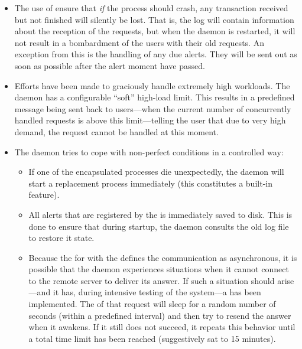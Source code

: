 \documentclass[a4paper,english,11pt,twoside,openright]{book}
\begin{document}
\begin{itemize}

\item The use of  ensure that \emph{if} the 
  process should crash, any transaction received but not finished will
  silently be lost.  That is, the log will contain information about
  the reception of the requests, but when the daemon is restarted, it
  will not result in a bombardment of the users with their old
  requests.  An exception from this is the handling of any due
   alerts.  They will be sent out as soon as possible after
  the alert moment have passed.


\item Efforts have been made to graciously handle extremely high
  workloads.  The daemon has a configurable ``soft'' high-load limit.
  This results in a predefined message being sent back to users---when
  the current number of concurrently handled requests is above this
  limit---telling the user that due to very high demand, the request
  cannot be handled at this moment.

\item The daemon tries to cope with non-perfect conditions in a
  controlled way:
  
  \begin{itemize}
    
  \item If one of the encapsulated  processes die
    unexpectedly, the daemon will start a replacement process
    immediately (this constitutes a built-in  feature).

  \item All alerts that are registered by the  is immediately
    saved to disk.  This is done to ensure that during startup, the
    daemon consults the old log file to restore it state.

  \item Because the  for  with the
      defines the communication as
    asynchronous, it is possible that the daemon experiences
    situations when it cannot connect to the remote server to deliver
    its answer.  If such a situation should arise---and it has, during
    intensive testing of the system---a 
    has been implemented.  The  of that request will sleep
    for a random number of seconds (within a predefined interval) and
    then try to resend the answer when it awakens.  If it still does
    not succeed, it repeats this behavior until a total time limit has
    been reached (suggestively sat to 15 minutes).


\end{itemize}
\end{itemize}
\end{document}
